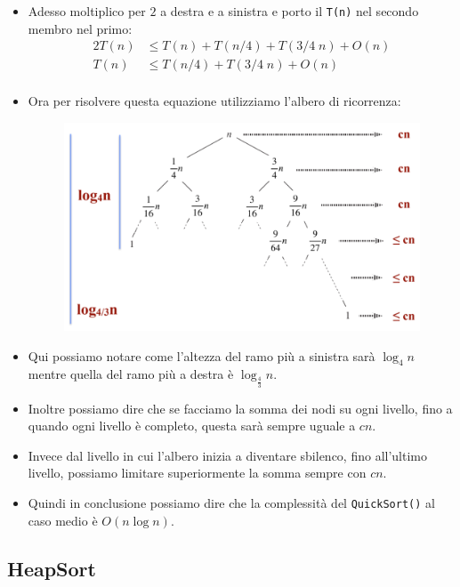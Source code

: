 \documentclass{article}
\begin{document}
\begin{itemize}
    \item Adesso moltiplico per $2$ a destra e a sinistra e porto il \verb|T(n)| nel secondo membro nel primo:
    \begin{equation*}
        \begin{split}
            2T(n) & \leq T(n) + T(n/4) + T(3/4 \; n) + O(n) \\
            T(n) & \leq T(n/4) + T(3/4 \; n) + O(n) \\
        \end{split}     
    \end{equation*}
    \item Ora per risolvere questa equazione utilizziamo l'albero di ricorrenza:
    \begin{figure}[h]
        \includegraphics[scale=0.5]{img/albero_quicksort.png}
        \centering
    \end{figure}
    \item Qui possiamo notare come l'altezza del ramo più a sinistra sarà $\log_4 n$ mentre quella del ramo più a destra è $\log_{\frac{4}{3}} n$.
    \item Inoltre possiamo dire che se facciamo la somma dei nodi su ogni livello, fino a quando ogni livello è completo, questa sarà sempre uguale a $cn$.
    \item Invece dal livello in cui l'albero inizia a diventare sbilenco, fino all'ultimo livello, possiamo limitare superiormente la somma sempre con $cn$.
    \item Quindi in conclusione possiamo dire che la complessità del \verb|QuickSort()| al caso medio è $O(n \log n)$.
\end{itemize}



\subsection{HeapSort}
\end{document}
